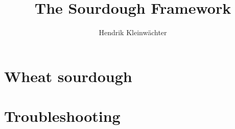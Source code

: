 \documentclass[paper=a4, twoside=false, fontsize=12pt, parskip=half,
                bibliography=totoc, listof=totoc]{scrbook}
\author{Hendrik Kleinwächter}
\title{The Sourdough Framework}
\begin{document}

\titlepage

\frontmatter
{%
\hypersetup{hidelinks}
\ifdefined\HCode\else\tableofcontents\fi
}




\mainmatter













\chapter{Wheat sourdough}%
\label{chapter:wheat-sourdough-translated}










\chapter{Troubleshooting}


\backmatter

{%
\hypersetup{hidelinks}
\listofflowcharts
\listoftables
\listoffigures
}
\printbibliography
\end{document}
